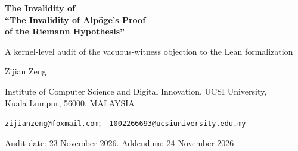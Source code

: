 \documentclass[11pt,a4paper]{article}
\theoremstyle{plain}
\theoremstyle{definition}
\theoremstyle{remark}
\begin{document}
\begin{center}
{\LARGE\bfseries The Invalidity of\\[0.3em] ``The Invalidity of Alpöge's Proof\\[0.3em] of the Riemann Hypothesis''\par}
\vspace{0.9em}
{\large A kernel-level audit of the vacuous-witness objection to the Lean formalization\par}
\vspace{1.4em}
{\large Zijian Zeng\par}
\vspace{0.35em}
{\small Institute of Computer Science and Digital Innovation, UCSI University,\\ Kuala Lumpur, 56000, MALAYSIA\par}
\vspace{0.3em}
{\small \href{mailto:zijianzeng@foxmail.com}{\texttt{zijianzeng@foxmail.com}};\ \ \href{mailto:1002266693@ucsiuniversity.edu.my}{\texttt{1002266693@ucsiuniversity.edu.my}}\par}
\vspace{0.9em}
{\small Audit date: 23 November 2026. Addendum: 24 November 2026\par}
\end{center}
\vspace{0.6em}
\end{document}

